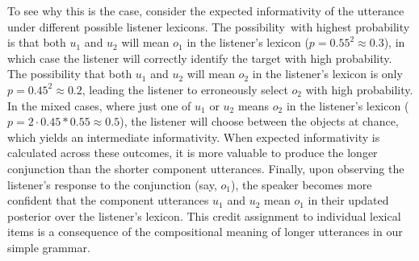 To see why this is the case, consider the expected informativity of the utterance under different possible listener lexicons.
The possibility with highest probability is that both $u_1$ and $u_2$ will mean $o_1$ in the listener's lexicon ($p = 0.55^2 \approx 0.3$), in which case the listener will correctly identify the target with high probability.
The possibility that both $u_1$ and $u_2$ will mean $o_2$ in the listener's lexicon is only $p=0.45^2 \approx 0.2$, leading the listener to erroneously select $o_2$ with high probability. 
In the mixed cases, where just one of $u_1$ or $u_2$ means $o_2$ in the listener's lexicon ($p = 2 \cdot 0.45 * 0.55 \approx 0.5$), the listener will choose between the objects at chance, which yields an intermediate informativity.
When expected informativity is calculated across these outcomes, it is more valuable to produce the longer conjunction than the shorter component utterances.
Finally, upon observing the listener's response to the conjunction (say, $o_1$), the speaker becomes more confident that the component utterances $u_1$ and $u_2$ mean $o_1$ in their updated posterior over the listener's lexicon.
This credit assignment to individual lexical items is a consequence of the compositional meaning of longer utterances in our simple grammar.

